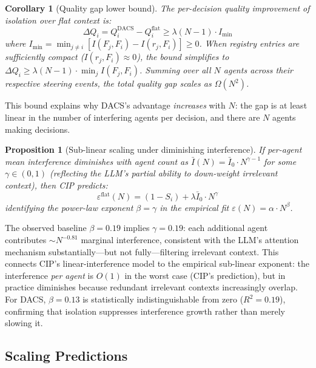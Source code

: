 \documentclass{article}
\newtheorem{proposition}{Proposition}
\newtheorem{corollary}{Corollary}
\begin{document}
\begin{corollary}[Quality gap lower bound]
\label{cor:gap}
The per-decision quality improvement of isolation over flat context is:
\begin{equation}
  \Delta Q_i = Q_i^{\text{DACS}} - Q_i^{\text{flat}}
  \geq \lambda(N-1) \cdot I_{\min}
  \label{eq:gap_bound}
\end{equation}
where $I_{\min} = \min_{j \neq i} [I(F_j, F_i) - I(r_j, F_i)]
\geq 0$.
When registry entries are sufficiently compact
($I(r_j, F_i) \approx 0$), the bound simplifies to
$\Delta Q_i \geq \lambda(N-1) \cdot \min_{j} I(F_j, F_i)$.
Summing over all $N$ agents across their respective steering events,
the total quality gap scales as $\Omega(N^2)$.
\end{corollary}

\noindent This bound explains why DACS's advantage \emph{increases}
with $N$: the gap is at least linear in the number of interfering
agents per decision, and there are $N$ agents making decisions.

\begin{proposition}[Sub-linear scaling under diminishing interference]
\label{prop:sublinear}
If per-agent mean interference diminishes with agent count as
$\bar{I}(N) = \bar{I}_0 \cdot N^{\gamma-1}$ for some
$\gamma \in (0,1)$ (reflecting the LLM's partial ability to
down-weight irrelevant context), then CIP predicts:
\begin{equation}
  \varepsilon^{\text{flat}}(N)
  = (1 - S_i) + \lambda \bar{I}_0 \cdot N^{\gamma}
  \label{eq:sublinear}
\end{equation}
identifying the power-law exponent
$\beta = \gamma$ in the empirical fit
$\varepsilon(N) = \alpha \cdot N^\beta$.
\end{proposition}

\noindent The observed baseline $\beta = 0.19$ implies $\gamma = 0.19$:
each additional agent contributes ${\sim}N^{-0.81}$ marginal
interference, consistent with the LLM's attention mechanism
substantially---but not fully---filtering irrelevant context.
This connects CIP's linear-interference model to the empirical
sub-linear exponent: the interference \emph{per agent} is $O(1)$ in the
worst case (CIP's prediction), but in practice diminishes because
redundant irrelevant contexts increasingly overlap.
For DACS, $\beta = 0.13$ is statistically indistinguishable from zero
($R^2 = 0.19$), confirming that isolation suppresses interference growth
rather than merely slowing it.

\subsection{Scaling Predictions}
\label{sec:scaling_pred}
\end{document}
